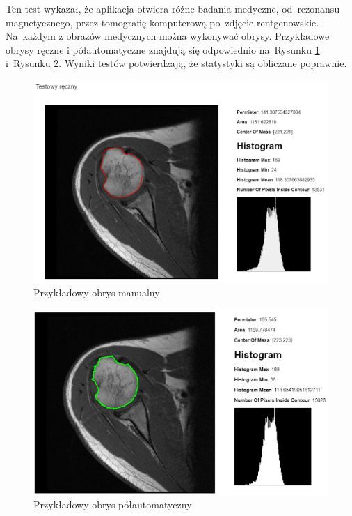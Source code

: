 \documentclass[a4paper,11pt,twoside,openright]{report}
\theoremstyle{definition}
\begin{document}
Ten test wykazał, że aplikacja otwiera różne badania medyczne, od~rezonansu
magnetycznego, przez tomografię komputerową po~zdjęcie rentgenowskie. Na~każdym
z obrazów medycznych można wykonywać obrysy. Przykładowe obrysy ręczne i
półautomatyczne znajdują się odpowiednio na~Rysunku \ref{fig:105} i~Rysunku
\ref{fig:107}. Wyniki testów potwierdzają, że statystyki są obliczane poprawnie.

\begin{figure}[p]
	\center
	\includegraphics[width=1\textwidth]{105}
	\caption{Przykładowy obrys manualny}
    	\label{fig:105}
\end{figure}

\begin{figure}[p]
	\center
	\includegraphics[width=1\textwidth]{107}
	\caption{Przykładowy obrys półautomatyczny}
    	\label{fig:107}
\end{figure}
\end{document}

